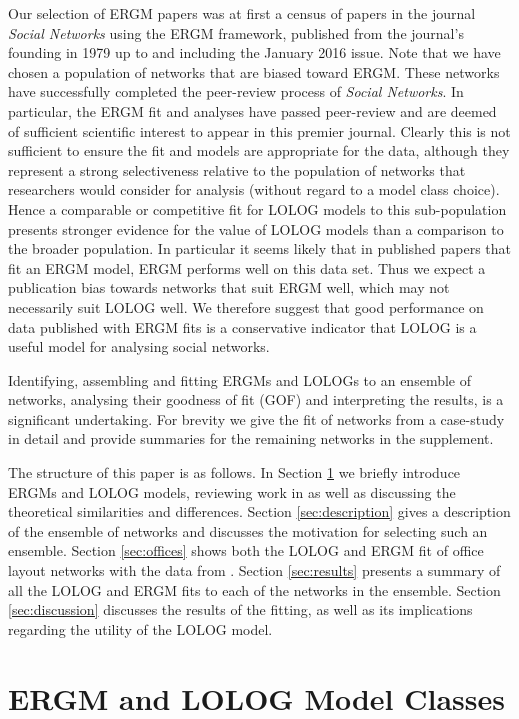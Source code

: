\documentclass[
]{statsoc}
\begin{document}
Our selection of ERGM papers was at first a census of papers in the
journal \textit{Social Networks} using the ERGM framework, published
from the journal's founding in 1979 up to and including the January 2016
issue. Note that we have chosen a population of networks that are biased
toward ERGM. These networks have successfully completed the peer-review
process of \textit{Social Networks}. In particular, the ERGM fit and
analyses have passed peer-review and are deemed of sufficient scientific
interest to appear in this premier journal. Clearly this is not
sufficient to ensure the fit and models are appropriate for the data,
although they represent a strong selectiveness relative to the
population of networks that researchers would consider for analysis
(without regard to a model class choice). Hence a comparable or
competitive fit for LOLOG models to this sub-population presents
stronger evidence for the value of LOLOG models than a comparison to the
broader population. In particular it seems likely that in published
papers that fit an ERGM model, ERGM performs well on this data set. Thus
we expect a publication bias towards networks that suit ERGM well, which
may not necessarily suit LOLOG well. We therefore suggest that good
performance on data published with ERGM fits is a conservative indicator
that LOLOG is a useful model for analysing social networks.

Identifying, assembling and fitting ERGMs and LOLOGs to an ensemble of
networks, analysing their goodness of fit (GOF) and interpreting the
results, is a significant undertaking. For brevity we give the fit of
networks from a case-study \citep{Sailer2012} in detail and provide
summaries for the remaining networks in the supplement.

The structure of this paper is as follows. In Section \ref{sec:LOLOG} we
briefly introduce ERGMs and LOLOG models, reviewing work in
\cite{Fellows2018} as well as discussing the theoretical similarities
and differences. Section \ref{sec:description} gives a description of
the ensemble of networks and discusses the motivation for selecting such
an ensemble. Section \ref{sec:offices} shows both the LOLOG and ERGM fit
of office layout networks with the data from \cite{Sailer2012}. Section
\ref{sec:results} presents a summary of all the LOLOG and ERGM fits to
each of the networks in the ensemble. Section \ref{sec:discussion}
discusses the results of the fitting, as well as its implications
regarding the utility of the LOLOG model.

\section{ERGM and LOLOG Model Classes}\label{sec:LOLOG}
\end{document}
